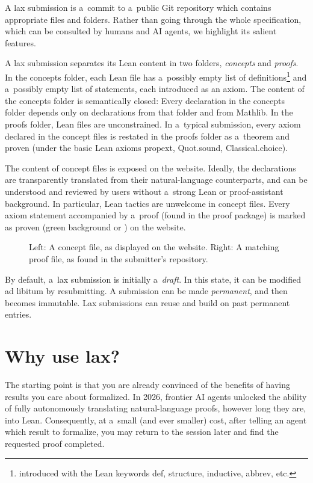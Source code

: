 \documentclass[11pt,a4paper]{article}
\DeclareRobustCommand{\laxthm}{%
  \tikz[baseline=(LaxTHM.base)]{%
    \node[
      draw=LaxThmBorder,
      fill=LaxThmBackground,
      text=LaxThmForeground,
      line width=.75bp,       %
      rounded corners=1.5bp, %
      inner xsep=3bp,         %
      inner ysep=.75bp,       %
      outer sep=0pt,
      font=\fontsize{7.65bp}{9.18bp}\selectfont
            \rmfamily\bfseries
    ] (LaxTHM) {%
      T\kern.04em
      H\kern.04em
      M\kern.04em
      \raisebox{-.08ex}{\ding{51}}%
    };%
  }%
  \kern1.5bp%
}
\begin{document}
A lax submission is a~commit to a~public Git repository which contains appropriate files and folders.
Rather than going through the whole specification, which can be consulted by humans and AI agents, we highlight its salient features.

A lax submission separates its Lean content in two folders, \emph{concepts} and \emph{proofs}.
In the concepts folder, each Lean file has a~possibly empty list of definitions\footnote{introduced with the Lean keywords \textsf{def}, \textsf{structure}, \textsf{inductive}, \textsf{abbrev}, etc.} and a~possibly empty list of statements, each introduced as an axiom.
The content of the concepts folder is semantically closed: Every declaration in the concepts folder depends only on declarations from that folder and from Mathlib.
In the proofs folder, Lean files are unconstrained.
In a~typical submission, every axiom declared in the concept files is restated in the proofs folder as a~theorem and proven (under the basic Lean axioms propext, Quot.sound, Classical.choice).

The content of concept files is exposed on the website.
Ideally, the declarations are transparently translated from their natural-language counterparts, and can be understood and reviewed by users without a~strong Lean or proof-assistant background.
In particular, Lean tactics are unwelcome in concept files.
Every axiom statement accompanied by a~proof (found in the proof package) is marked as proven (green background or \laxthm) on the website.

\begin{figure}[!ht]
  \centering
  
  \caption{Left: A concept file, as displayed on the website. Right: A matching proof file, as found in the submitter's repository.}
  \label{fig:concept-proof}
\end{figure}

By default, a~lax submission is initially a~\emph{draft}.
In this state, it can be modified ad libitum by resubmitting.
A submission can be made \emph{permanent}, and then becomes immutable.
Lax submissions can reuse and build on past permanent entries.

\section{Why use lax?}

The starting point is that you are already convinced of the benefits of having results you care about formalized.
In 2026, frontier AI agents unlocked the ability of fully autonomously translating natural-language proofs, however long they are, into Lean.
Consequently, at a~small (and ever smaller) cost, after telling an agent which result to formalize, you may return to the session later and find the requested proof completed.
\end{document}
